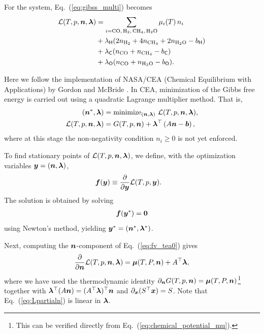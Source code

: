 For the  system, Eq.~(\ref{eq:gibss_multi}) becomes
\begin{align}
    \mathcal{L}(T, p, \nv,\lambdav) &= \sum_{i = \ce{CO, H2, CH4, H2O}} \mu_i (T) \, n_i \nonumber \\ 
    &+ \lambda_{\Hel} (2 n_{\ce{H2}} + 4 n_{\ce{CH4}} + 2 n_{\ce{H2O}} - b_\Hel) \nonumber \\
    &+ \lambda_{\Cel} (n_{\ce{CO}} + n_{\ce{CH4}} - b_\Cel) \nonumber \\ 
    &+ \lambda_{\Oel} (n_{\ce{CO}} + n_{\ce{H2O}} - b_\Oel).
\end{align}

Here we follow the implementation of NASA/CEA (Chemical Equilibrium with Applications) by Gordon and McBride \cite{gordon1994computer,2024arXiv241207166G}. In CEA, minimization of the Gibbs free energy is carried out using a quadratic Lagrange multiplier method. That is,
\begin{align}
    (\boldsymbol{n}^\ast, \boldsymbol{\lambda})  &= \mathrm{minimize}_{(\boldsymbol{n},\boldsymbol{\lambda})} \,\, \mathcal{L}(T, p, \boldsymbol{n}, \boldsymbol{\lambda}), \\
    \mathcal{L}(T, p, \boldsymbol{n},\boldsymbol{\lambda}) &= G(T, p, \boldsymbol{n}) + \boldsymbol{\lambda}^\top \left(A \boldsymbol{n} - \boldsymbol{b}\right),
\end{align}
where at this stage the non-negativity condition $n_i \ge 0$ is not yet enforced.

To find stationary points of $\mathcal{L}(T, p, \boldsymbol{n}, \boldsymbol{\lambda})$, we define, with the optimization variables $\boldsymbol{y} = (\boldsymbol{n}, \boldsymbol{\lambda})$,
\begin{align}
\label{eq:fv_tea0}
    \boldsymbol{f}(\boldsymbol{y}) &\equiv \frac{\partial}{\partial \boldsymbol{y}} \mathcal{L}(T, p, \boldsymbol{y}).
\end{align}
The solution is obtained by solving
\begin{align}
    \label{eq:fv_tea}
    \boldsymbol{f}(\boldsymbol{y}^\ast) = \boldsymbol{0}
\end{align}
using Newton’s method, yielding $\boldsymbol{y}^\ast = (\boldsymbol{n}^\ast, \boldsymbol{\lambda}^\ast)$.  

Next, computing the $\boldsymbol{n}$-component of Eq.~(\ref{eq:fv_tea0}) gives
\begin{align}
\label{eq:Lpartialn}
    \frac{\partial}{\partial \boldsymbol{n}}   \mathcal{L}(T, p, \boldsymbol{n}, \boldsymbol{\lambda}) =  \boldsymbol{\mu} (T, P, \boldsymbol{n}) + A^\top \boldsymbol{\lambda},
\end{align}
where we have used the thermodynamic identity $\partial_{\boldsymbol{n}} G(T, p, \boldsymbol{n}) =  \boldsymbol{\mu} (T, P, \boldsymbol{n})$\footnote{This can be verified directly from Eq.~(\ref{eq:chemical_potential_mu}).} together with $\boldsymbol{\lambda}^\top (A \boldsymbol{n}) = (A^\top \boldsymbol{\lambda})^\top \boldsymbol{n}$ and $\partial_{\boldsymbol{x}} (S^\top \boldsymbol{x}) = S$.  
Note that Eq.~(\ref{eq:Lpartialn}) is linear in $\boldsymbol{\lambda}$.  

